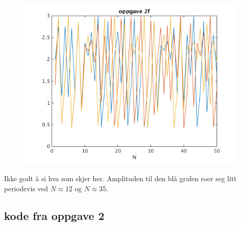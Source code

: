 \documentclass[11pt]{article}
\begin{document}
	\subsection*{}
		\begin{figure}[H]
			\includegraphics[width=13cm]{oppg2f}
		\end{figure}
		\noindent Ikke godt å si hva som skjer her. Amplituden til den blå grafen roer seg litt periodevis ved $N\approx12$ og $N\approx35$. 
	\subsection*{kode fra oppgave 2}
			\begin{figure}[H]
				
			\end{figure}
			\begin{figure}[H]
				
			\end{figure}
			\begin{figure}[H]
				
			\end{figure}
			\begin{figure}[H]
				
			\end{figure}
			\begin{figure}[H]
				
			\end{figure}
\end{document}
